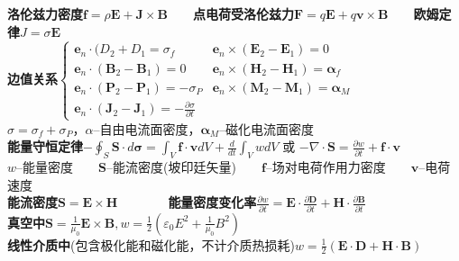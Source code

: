 \documentclass[10pt,a4paper]{article}
\begin{document}
\begin{multicols}{2}
\textbf{洛伦兹力密度}$\bm{f}=\rho\bm{E}+\bm{J}\times\bm{B}$~~~~\textbf{点电荷受洛伦兹力}$\bm{F}=q\bm{E}+q\bm{v}\times\bm{B}$~~~~\textbf{欧姆定律}$J=\sigma\bm{E}$\\
\textbf{边值关系}$\left\{\begin{array}{ll}\bm{e}_n\cdot(D_2+D_1=\sigma_f&\bm{e}_n\times(\bm{E}_2-\bm{E}_1)=0\\\bm{e}_n\cdot(\bm{B}_2-\bm{B}_1)=0&\bm{e}_n\times(\bm{H}_2-\bm{H}_1)=\bm{\alpha}_f\\\bm{e}_n\cdot(\bm{P}_2-\bm{P}_1)=-\sigma_P&\bm{e}_n\times(\bm{M}_2-\bm{M}_1)=\bm{\alpha}_M\\\bm{e}_n\cdot(\bm{J}_2-\bm{J}_1)=-\frac{\partial\sigma}{\partial t}\end{array}\right.$\\
$\sigma=\sigma_f+\sigma_P$，$\alpha$--自由电流面密度，$\bm{\alpha}_M$--磁化电流面密度\\
\textbf{能量守恒定律}$-\oint_S\bm{S}\cdot d\bm{\sigma}=\int_V\bm{f}\cdot\bm{v}dV+\frac{d}{dt}\int_VwdV$ 或 $-\nabla\cdot\bm{S}=\frac{\partial w}{\partial t}+\bm{f}\cdot\bm{v}$\\
$w$--能量密度~~~~$\bm{S}$--能流密度(坡印廷矢量)~~~~$\bm{f}$--场对电荷作用力密度~~~~$\bm{v}$--电荷速度\\
\indent\textbf{能流密度}$\bm{S}=\bm{E}\times\bm{H}$~~~~~~~~\textbf{能量密度变化率}$\frac{\partial w}{\partial t}=\bm{E}\cdot\frac{\partial\bm{D}}{\partial t}+\bm{H}\cdot\frac{\partial\bm{B}}{\partial t}$\\
\indent\indent\textbf{真空中}$\bm{S}=\frac{1}{\mu_0}\bm{E}\times\bm{B},w=\frac{1}{2}(\varepsilon_0E^2+\frac{1}{\mu_0}B^2)$\\
\tiny\indent\indent\textbf{线性介质中}(包含极化能和磁化能，不计介质热损耗)$w=\frac{1}{2}(\bm{E}\cdot\bm{D}+\bm{H}\cdot\bm{B})$\scriptsize
\end{multicols}
\end{document}
